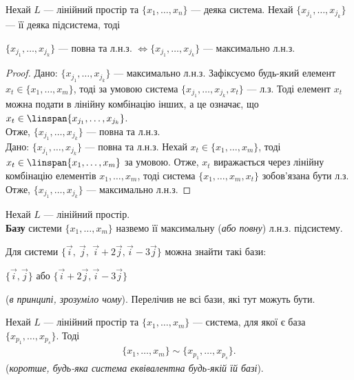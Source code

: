 \documentclass{math_library}
\begin{document}
	\begin{proposition}
	Нехай $L$ --- лінійний простір та $\{x_1,\dots,x_n\}$ --- деяка система. Нехай $\{x_{j_1}, \dots, x_{j_k}\}$ --- її деяка підсистема, тоді
	\begin{center}
	$\{x_{j_1}, \dots, x_{j_k}\}$ --- повна та л.н.з. $\iff \{x_{j_1}, \dots, x_{j_k}\}$ --- максимально л.н.з.
	\end{center}
	\end{proposition}
	
	\begin{proof}
	\leftproof Дано: $\{x_{j_1}, \dots, x_{j_k}\}$ --- максимально л.н.з. Зафіксуємо будь-який елемент $x_t \in \{x_1,\dots,x_m\}$, тоді за умовою система $\{x_{j_1}, \dots, x_{j_k}, x_t\}$ --- л.з. Тоді елемент $x_t$ можна подати в лінійну комбінацію інших, а це означає, що $x_t \in \linspan\{x_{j_1},\dots,x_{j_k}\}$.	\\
	Отже, $\{x_{j_1},\dots, x_{j_k}\}$ --- повна та л.н.з.
	\bigskip \\
	\rightproof Дано: $\{x_{j_1}, \dots, x_{j_k}\}$ --- повна та л.н.з. Нехай $x_t \in \{x_1,\dots,x_m\}$, тоді $x_t \in \linspan\{x_1,\dots,x_m\}$ за умовою. Отже, $x_t$ виражається через лінійну комбінацію елементів $x_1,\dots,x_m$, тоді система $\{x_1,\dots,x_m,x_t\}$ зобов'язана бути л.з. \\
	Отже, $\{x_{j_1},\dots, x_{j_k}\}$ --- максимально л.н.з.	
\end{proof}
	
	\begin{definition}
	Нехай $L$ --- лінійний простір.\\
	\textbf{Базу} системи $\{x_1, \dots, x_m\}$ назвемо її максимальну (\textit{або повну}) л.н.з. підсистему.
	\end{definition}
	
	\begin{example}
	Для системи $\{\vec{i},\ \vec{j},\ \vec{i}+2\vec{j}, \vec{i}-3\vec{j} \}$ можна знайти такі бази:
	\begin{center}	
	$\{\vec{i},\vec{j}\}$ або $\{\vec{i}+2\vec{j},\vec{i}-3\vec{j}\}$
		\end{center}
(\textit{в принципі, зрозуміло чому}). Перелічив не всі бази, які тут можуть бути.
	\end{example}
	
	\begin{theorem}
	\label{two_bases_equivalent}
	Нехай $L$ --- лінійний простір та $\{x_1, \dots, x_m\}$ --- система, для якої є база $\{x_{p_1}, \dots, x_{p_s}\}$. Тоді
	\begin{align*}
	\{x_1, \dots, x_m\} \sim \{x_{p_1}, \dots, x_{p_s}\}.
	\end{align*}
	(\textit{коротше, будь-яка система еквівалентна будь-якій їй базі}).
	\end{theorem}
	
\end{document}
